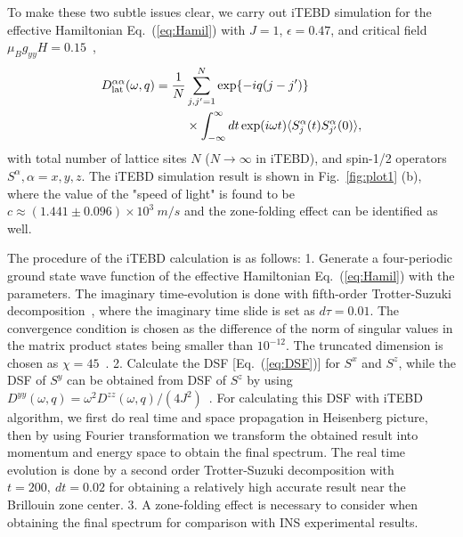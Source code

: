 \documentclass[aps,prl,twocolumn,superscriptaddress,groupedaddress]{revtex4}
\begin{document}
To make these two subtle issues clear, we carry out iTEBD simulation 
for the effective Hamiltonian Eq.~(\ref{eq:Hamil})
with $J=1$, $\epsilon=0.47$, and critical field $\mu_B g_{yy}H=0.15$~\cite{Zou_2019,Zou_2021}, 
\begin{align}
\begin{split}
D_{\rm{lat}}^{\alpha\alpha}(\omega,q)=\frac{1}{N}&\sum_{j,j'=1}^{N}\exp\{-iq(j-j')\}\\
&\times\int_{-\infty}^{\infty}dt \exp(i\omega t)\langle S_{j}^{\alpha}(t)S_{j'}^{\alpha}(0)\rangle,
\label{eq:DSF}
\end{split}
\end{align}
with total number of lattice sites $N$ ($N \to \infty$ in iTEBD), and spin-1/2 operators $S^{\alpha},\alpha=x,y,z$. 
The iTEBD simulation result is shown in Fig.~\ref{fig:plot1} (b), where
the value of the "speed of light" is found to be $c \approx (1.441 \pm 0.096)\times 10^{3}~m/s$ and the zone-folding effect can be identified as well.


The procedure of the iTEBD calculation is as follows: 1. Generate a four-periodic
ground state wave function of the effective Hamiltonian Eq.~(\ref{eq:Hamil})
with the parameters. The imaginary time-evolution is done
with fifth-order Trotter-Suzuki decomposition~\cite{Hatano2005}, where the imaginary time
slide is set as $d\tau=0.01$. The convergence condition is chosen as the
difference of the norm of singular values in the matrix product states being smaller than $10^{-12}$. The truncated dimension is chosen as $\chi=45$~\cite{PhysRevLett.98.070201,PhysRevA.79.043601}. 2. Calculate the DSF [Eq.~(\ref{eq:DSF})]
for $S^{x}$ and $S^{z}$, while the DSF of $S^{y}$ can be obtained from DSF of $S^{z}$ by using $D^{yy}(\omega,q)=\omega^2 D^{zz}(\omega,q)/(4J^2)$~\cite{PhysRevLett.113.247201}. For calculating this DSF with iTEBD algorithm, we first do real time and space propagation in Heisenberg picture, then by using Fourier transformation
we transform the obtained result into momentum and energy space
to obtain the final spectrum. The real time evolution is done
by a second order Trotter-Suzuki decomposition with $t=200,~dt=0.02$ for obtaining a relatively high accurate result near the Brillouin zone center. 3. A zone-folding effect is necessary to consider when obtaining the final spectrum for comparison with INS experimental results.


\par
\end{document}
